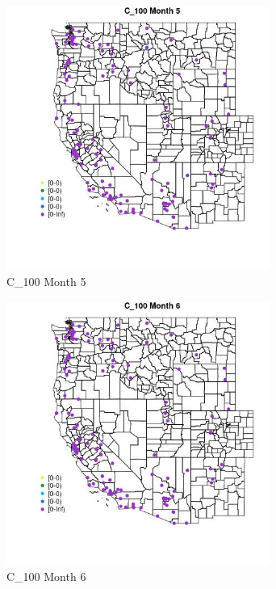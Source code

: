 \begin{figure} 
\centering  
\includegraphics[width=0.77\textwidth]{Code_Outputs/Report_ML_input_PM25_Step4_part_e_de_duplicated_aves_MapObsMo5C_100.jpg} 
\caption{\label{fig:Report_ML_input_PM25_Step4_part_e_de_duplicated_avesMapObsMo5C_100}C_100 Month 5} 
\end{figure} 
 

\clearpage 

\begin{figure} 
\centering  
\includegraphics[width=0.77\textwidth]{Code_Outputs/Report_ML_input_PM25_Step4_part_e_de_duplicated_aves_MapObsMo6C_100.jpg} 
\caption{\label{fig:Report_ML_input_PM25_Step4_part_e_de_duplicated_avesMapObsMo6C_100}C_100 Month 6} 
\end{figure} 
 

